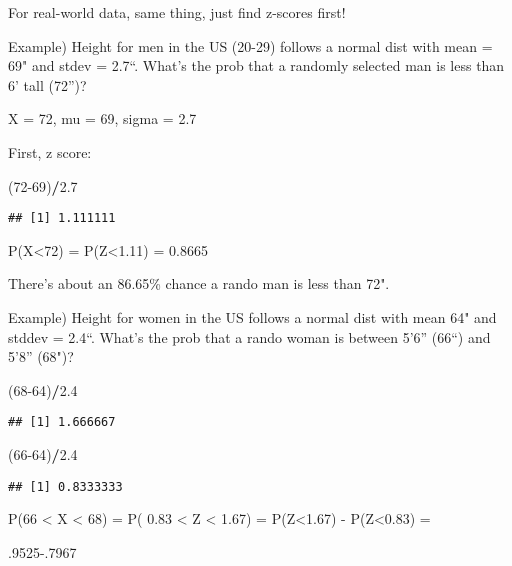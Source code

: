 \documentclass[]{article}
\newenvironment{Shaded}{\begin{snugshade}}{\end{snugshade}}
\newcommand{\DecValTok}[1]{\textcolor[rgb]{0.00,0.00,0.81}{#1}}
\newcommand{\FloatTok}[1]{\textcolor[rgb]{0.00,0.00,0.81}{#1}}
\newcommand{\NormalTok}[1]{#1}
\newcommand{\OperatorTok}[1]{\textcolor[rgb]{0.81,0.36,0.00}{\textbf{#1}}}
\begin{document}
For real-world data, same thing, just find z-scores first!

Example) Height for men in the US (20-29) follows a normal dist with
mean = 69" and stdev = 2.7``. What's the prob that a randomly selected
man is less than 6' tall (72'')?

X = 72, mu = 69, sigma = 2.7

First, z score:

\begin{Shaded}
\begin{Highlighting}[]
\NormalTok{(}\DecValTok{72-69}\NormalTok{)}\OperatorTok{/}\FloatTok{2.7}
\end{Highlighting}
\end{Shaded}

\begin{verbatim}
## [1] 1.111111
\end{verbatim}

P(X\textless{}72) = P(Z\textless{}1.11) = 0.8665

There's about an 86.65\% chance a rando man is less than 72".

Example) Height for women in the US follows a normal dist with mean 64"
and stddev = 2.4``. What's the prob that a rando woman is between 5'6''
(66``) and 5'8'' (68")?

\begin{Shaded}
\begin{Highlighting}[]
\NormalTok{(}\DecValTok{68-64}\NormalTok{)}\OperatorTok{/}\FloatTok{2.4}
\end{Highlighting}
\end{Shaded}

\begin{verbatim}
## [1] 1.666667
\end{verbatim}

\begin{Shaded}
\begin{Highlighting}[]
\NormalTok{(}\DecValTok{66-64}\NormalTok{)}\OperatorTok{/}\FloatTok{2.4}
\end{Highlighting}
\end{Shaded}

\begin{verbatim}
## [1] 0.8333333
\end{verbatim}

P(66 \textless{} X \textless{} 68) = P( 0.83 \textless{} Z \textless{}
1.67) = P(Z\textless{}1.67) - P(Z\textless{}0.83) =

\begin{Shaded}
\begin{Highlighting}[]
\FloatTok{.9525-.7967}
\end{Highlighting}
\end{Shaded}
\end{document}
